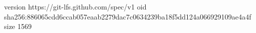 version https://git-lfs.github.com/spec/v1
oid sha256:886065cdd6ccab057eaab2279dac7c0634239ba18f5dd124a066929109ae4a4f
size 1569
